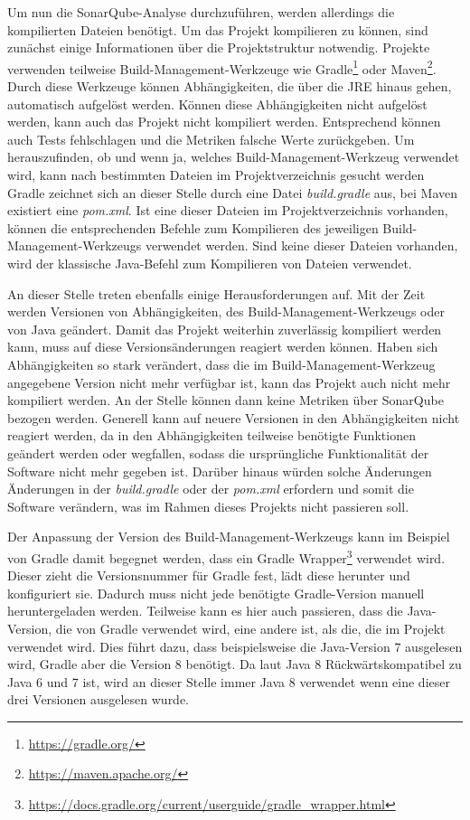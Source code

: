 \documentclass[
	oneside,  %
	ngerman, 
	final, 
	11pt, 
	a4paper, 
	1.1headlines, 
	headinclude=false, 
	footinclude=false, 
	mpinclude=false, 
	pagesize, 
	onecolumn, 
	titlepage, 
	parskip=half, 
	headsepline, 
	chapterprefix=false, 
	version=first, 
	listof=totoc, 
	bibliography=totoc, 
	toc=graduated, 
	fleqn
]{scrbook}
\begin{document}
Um nun die SonarQube-Analyse durchzuführen, werden allerdings die kompilierten Dateien benötigt.
Um das Projekt kompilieren zu können, sind zunächst einige Informationen über die Projektstruktur notwendig.
Projekte verwenden teilweise Build-Management-Werkzeuge wie Gradle\footnote{\url{https://gradle.org/}} oder Maven\footnote{\url{https://maven.apache.org/}}.
Durch diese Werkzeuge können Abhängigkeiten, die über die \acf{JRE} hinaus gehen, automatisch aufgelöst werden.
Können diese Abhängigkeiten nicht aufgelöst werden, kann auch das Projekt nicht kompiliert werden.
Entsprechend können auch Tests fehlschlagen und die Metriken falsche Werte zurückgeben.
Um herauszufinden, ob und wenn ja, welches Build-Management-Werkzeug verwendet wird, kann nach bestimmten Dateien im Projektverzeichnis gesucht werden
Gradle zeichnet sich an dieser Stelle durch eine Datei \textit{build.gradle} aus, bei Maven existiert eine \textit{pom.xml}.
Ist eine dieser Dateien im Projektverzeichnis vorhanden, können die entsprechenden Befehle zum Kompilieren des jeweiligen Build-Management-Werkzeugs verwendet werden.
Sind keine dieser Dateien vorhanden, wird der klassische Java-Befehl zum Kompilieren von Dateien verwendet.

An dieser Stelle treten ebenfalls einige Herausforderungen auf.
Mit der Zeit werden Versionen von Abhängigkeiten, des Build-Management-Werkzeugs oder von Java geändert.
Damit das Projekt weiterhin zuverlässig kompiliert werden kann, muss auf diese Versionsänderungen reagiert werden können.
Haben sich Abhängigkeiten so stark verändert, dass die im Build-Management-Werkzeug angegebene Version nicht mehr verfügbar ist, kann das Projekt auch nicht mehr kompiliert werden.
An der Stelle können dann keine Metriken über SonarQube bezogen werden.
Generell kann auf neuere Versionen in den Abhängigkeiten nicht reagiert werden, da in den Abhängigkeiten teilweise benötigte Funktionen geändert werden oder wegfallen, sodass die ursprüngliche Funktionalität der Software nicht mehr gegeben ist.
Darüber hinaus würden solche Änderungen Änderungen in der \textit{build.gradle} oder der \textit{pom.xml} erfordern und somit die Software verändern, was im Rahmen dieses Projekts nicht passieren soll.

Der Anpassung der Version des Build-Management-Werkzeugs kann im Beispiel von Gradle damit begegnet werden, dass ein Gradle Wrapper\footnote{\url{https://docs.gradle.org/current/userguide/gradle_wrapper.html}} verwendet wird.
Dieser zieht die Versionsnummer für Gradle fest, lädt diese herunter und konfiguriert sie.
Dadurch muss nicht jede benötigte Gradle-Version manuell heruntergeladen werden.
Teilweise kann es hier auch passieren, dass die Java-Version, die von Gradle verwendet wird, eine andere ist, als die, die im Projekt verwendet wird.
Dies führt dazu, dass beispielsweise die Java-Version 7 ausgelesen wird, Gradle aber die Version 8 benötigt.
Da laut \cite{OB2021} Java 8 Rückwärtskompatibel zu Java 6 und 7 ist, wird an dieser Stelle immer Java 8 verwendet wenn eine dieser drei Versionen ausgelesen wurde.
\end{document}
